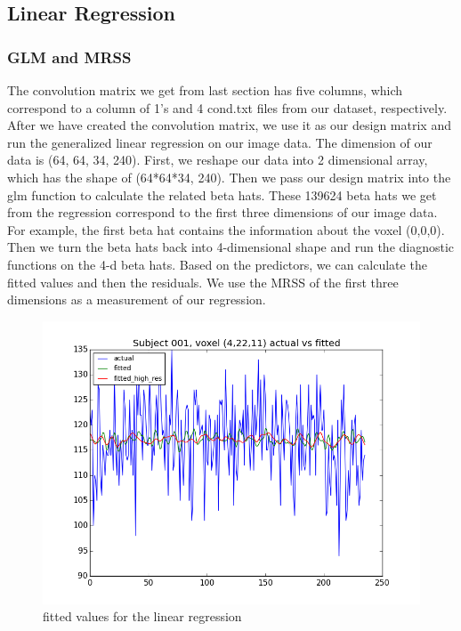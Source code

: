 \subsection{Linear Regression}
\subsubsection{GLM and MRSS}
\noindent
The convolution matrix we get from last section has five columns, which correspond to a column of 1's and 4 cond.txt files from our dataset, respectively. After we have created the convolution matrix, we use it as our design matrix and run the generalized linear regression on our image data. The dimension of our data is (64, 64, 34, 240). First, we reshape our data into 2 dimensional array, which has the shape of (64*64*34, 240). Then we pass our design matrix into the glm function to calculate the related beta hats. These 139624 beta hats we get from the regression correspond to the first three dimensions of our image data. For example, the first beta hat contains the information about the voxel (0,0,0). Then we turn the beta hats back into 4-dimensional shape and run the diagnostic functions on the 4-d beta hats. Based on the predictors, we can calculate the fitted values and then the residuals. We use the MRSS of the first three dimensions as a measurement of our regression. \newline

\begin{figure}[H]
    \centering
        \includegraphics[scale=0.5]{../plots/glm_fitted.png}
    \caption{fitted values for the linear regression}
\end{figure}


